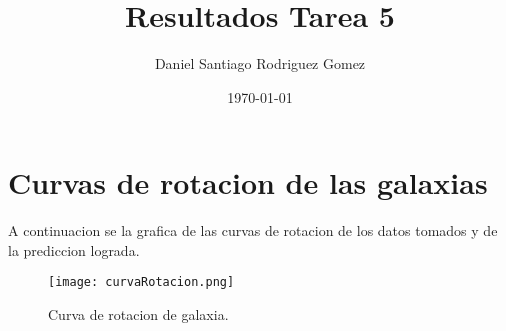 \documentclass[letterpaper,12pt]{article}
\begin{document}
\title{Resultados Tarea 5}
\author{Daniel Santiago Rodriguez Gomez}
\date{\today}
\maketitle

\section{Curvas de rotacion de las galaxias}

A continuacion se la grafica de las curvas de rotacion de los datos tomados y de la prediccion lograda.
\begin{figure}[ht] 
	\texttt{[image: curvaRotacion.png]}

		 \caption{
        	        \label{fig:exp_plots}  
            	    Curva de rotacion de galaxia.
        }
\end{figure}
\end{document}
